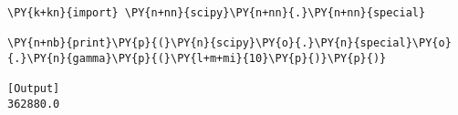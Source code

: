 \begin{Verbatim}[label=\makebox{\href{https://bitbucket.org/lbaldini/statnotes/src/master/snippets/scipy.special.gamma.py}{https://bitbucket.org/.../scipy.special.gamma.py}},commandchars=\\\{\}]
\PY{k+kn}{import} \PY{n+nn}{scipy}\PY{n+nn}{.}\PY{n+nn}{special}

\PY{n+nb}{print}\PY{p}{(}\PY{n}{scipy}\PY{o}{.}\PY{n}{special}\PY{o}{.}\PY{n}{gamma}\PY{p}{(}\PY{l+m+mi}{10}\PY{p}{)}\PY{p}{)}

[Output]
362880.0
\end{Verbatim}